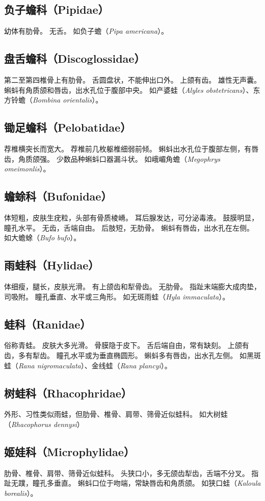 \documentclass[11pt]{article}
\begin{document}
\subsection{负子蟾科（Pipidae）}
幼体有肋骨。
无舌。
如负子蟾（\textit{Pipa americana}）。

\subsection{盘舌蟾科（Discoglossidae）}
第二至第四椎骨上有肋骨。
舌圆盘状，不能伸出口外。
上颌有齿。
雄性无声囊。
蝌蚪有角质颌和唇齿，出水孔位于腹部中央。
如产婆蛙（\textit{Alyles obstetricans}）、东方铃蟾（\textit{Bombina orientalis}）。

\subsection{锄足蟾科（Pelobatidae）}
荐椎横突长而宽大。
荐椎前几枚躯椎细弱前倾。
蝌蚪出水孔位于腹部左侧，有唇齿，角质颌强。
少数品种蝌蚪口器漏斗状。
如峨嵋角蟾（\textit{Megophrys omeimonlis}）。

\subsection{蟾蜍科（Bufonidae）}
体短粗，皮肤生疣粒，头部有骨质棱嵴。
耳后腺发达，可分泌毒液。
鼓膜明显，瞳孔水平。
无齿，舌端自由。
后肢短，无肋骨。
蝌蚪有唇齿，出水孔在左侧。
如大蟾蜍（\textit{Bufo bufo}）。

\subsection{雨蛙科（Hylidae）}
体细瘦，腿长，皮肤光滑。
有上颌齿和犁骨齿。
无肋骨。
指趾末端膨大成肉垫，司吸附。
瞳孔垂直、水平或三角形。
如无斑雨蛙（\textit{Hyla immaculata}）。

\subsection{蛙科（Ranidae）}
俗称青蛙。
皮肤大多光滑。
骨膜隐于皮下。
舌后端自由，常有缺刻。
上颌有齿，多有犁齿。
瞳孔水平或为垂直椭圆形。
蝌蚪多有唇齿，出水孔左侧。
如黑斑蛙（\textit{Rana nigromaculata}）、金线蛙（\textit{Rana plancyi}）。

\subsection{树蛙科（Rhacophridae）}
外形、习性类似雨蛙，但肋骨、椎骨、肩带、筛骨近似蛙科。
如大树蛙（\textit{Rhacophorus dennysi}）

\subsection{姬娃科（Microphylidae）}
肋骨、椎骨、肩带、筛骨近似蛙科。
头狭口小，多无颌齿犁齿，舌端不分叉。
指趾无蹼，瞳孔多垂直。
蝌蚪口位于吻端，常缺唇齿和角质颌。
如狭口蛙（\textit{Kaloula borealis}）。
\end{document}
